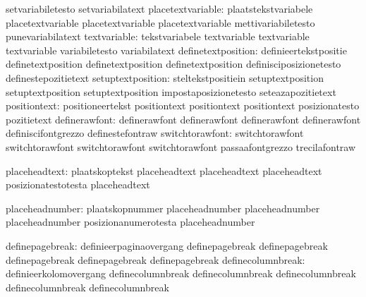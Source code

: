                                   setvariabiletesto                setvariabilatext %
               placetextvariable: plaatstekstvariabele             placetextvariable
                                  placetextvariable                placetextvariable
                                  mettivariabiletesto              punevariabilatext
                    textvariable: tekstvariabele                   textvariable
                                  textvariable                     textvariable
                                  variabiletesto                   variabilatext
              definetextposition: definieertekstpositie            definetextposition
                                  definetextposition               definetextposition
                                  definisciposizionetesto          definestepozitietext
               setuptextposition: steltekstpositiein               setuptextposition
                                  setuptextposition                setuptextposition
                                  impostaposizionetesto            seteazapozitietext
                    positiontext: positioneertekst                 positiontext
                                  positiontext                     positiontext
                                  posizionatesto                   pozitietext %
                   definerawfont: definerawfont                    definerawfont
                                  definerawfont                    definerawfont
                                  definiscifontgrezzo              definestefontraw
                 switchtorawfont: switchtorawfont                  switchtorawfont
                                  switchtorawfont                  switchtorawfont
                                  passaafontgrezzo                 trecilafontraw

  placeheadtext: plaatskoptekst           placeheadtext
                 placeheadtext            placeheadtext
                 posizionatestotesta      placeheadtext

placeheadnumber: plaatskopnummer          placeheadnumber
                 placeheadnumber          placeheadnumber
                 posizionanumerotesta     placeheadnumber

  definepagebreak: definieerpaginaovergang  definepagebreak
                   definepagebreak          definepagebreak
                   definepagebreak          definepagebreak
definecolumnbreak: definieerkolomovergang  definecolumnbreak
                   definecolumnbreak       definecolumnbreak
                   definecolumnbreak       definecolumnbreak

